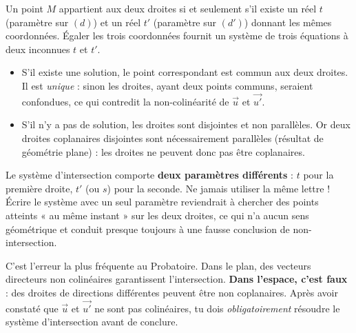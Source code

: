 \documentclass[11pt]{article}
\newcounter{popsec}
\newcounter{popsub}
\newcommand{\courssub}[1]{%
  \stepcounter{popsub}%
  \par\vspace{9pt}\noindent{\popxbold\fontsize{11.5}{13}\selectfont\color{popink}{\color{poporange}\thepopsec.\thepopsub}\hspace{6pt}#1}\par\nopagebreak\vspace{4pt}
}
\begin{document}
\begin{experience}
Un point $M$ appartient aux deux droites si et seulement s'il existe un réel $t$ (paramètre sur $(d)$) et un réel $t'$ (paramètre sur $(d')$) donnant les mêmes coordonnées. Égaler les trois coordonnées fournit un système de trois équations à deux inconnues $t$ et $t'$.
\begin{itemize}
\item S'il existe une solution, le point correspondant est commun aux deux droites. Il est \emph{unique} : sinon les droites, ayant deux points communs, seraient confondues, ce qui contredit la non-colinéarité de $\vec{u}$ et $\vec{u'}$.
\item S'il n'y a pas de solution, les droites sont disjointes et non parallèles. Or deux droites coplanaires disjointes sont nécessairement parallèles (résultat de géométrie plane) : les droites ne peuvent donc pas être coplanaires.
\end{itemize}
\end{experience}

\begin{attention}
Le système d'intersection comporte \textbf{deux paramètres différents} : $t$ pour la première droite, $t'$ (ou $s$) pour la seconde. Ne jamais utiliser la même lettre ! Écrire le système avec un seul paramètre reviendrait à chercher des points atteints « au même instant » sur les deux droites, ce qui n'a aucun sens géométrique et conduit presque toujours à une fausse conclusion de non-intersection.
\end{attention}

\begin{attention}
C'est l'erreur la plus fréquente au Probatoire. Dans le plan, des vecteurs directeurs non colinéaires garantissent l'intersection. \textbf{Dans l'espace, c'est faux} : des droites de directions différentes peuvent être non coplanaires. Après avoir constaté que $\vec{u}$ et $\vec{u'}$ ne sont pas colinéaires, tu dois \emph{obligatoirement} résoudre le système d'intersection avant de conclure.
\end{attention}

\courssub{Stratégie générale d'étude}
\end{document}
